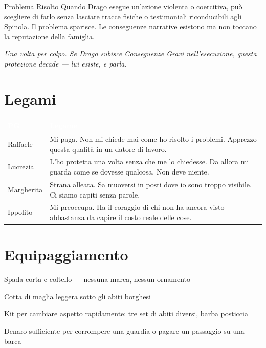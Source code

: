 
\begin{spinolabox}{Problema Risolto}
  Quando Drago esegue un'azione violenta o coercitiva, può scegliere di farlo
  senza lasciare tracce fisiche o testimoniali riconducibili agli Spinola.
  Il problema sparisce. Le conseguenze narrative esistono ma non toccano
  la reputazione della famiglia.

  \medskip\noindent\textit{Una volta per colpo. Se Drago subisce Conseguenze
  Gravi nell'esecuzione, questa protezione decade — lui esiste, e parla.}
\end{spinolabox}

\section*{Legami}

\begin{table}[h]
\centering\renewcommand{\arraystretch}{1.4}
\begin{tabularx}{\linewidth}{@{}L{2.6cm} X@{}}
  \toprule{}
  \textcolor{white}{\textbf{PG}} & \textcolor{white}{\textbf{Legame}} \\
  \midrule
  Raffaele & Mi paga. Non mi chiede mai come ho risolto i problemi.
            Apprezzo questa qualità in un datore di lavoro. \\
  Lucrezia & L'ho protetta una volta senza che me lo chiedesse.
            Da allora mi guarda come se dovesse qualcosa. Non deve niente. \\
  Margherita & Strana alleata. Sa muoversi in posti dove io sono troppo
              visibile. Ci siamo capiti senza parole. \\
  Ippolito & Mi preoccupa. Ha il coraggio di chi non ha ancora visto
            abbastanza da capire il costo reale delle cose. \\
  \bottomrule
\end{tabularx}
\end{table}

\section*{Equipaggiamento}
\begin{goldlist}
  \item Spada corta e coltello — nessuna marca, nessun ornamento
  \item Cotta di maglia leggera sotto gli abiti borghesi
  \item Kit per cambiare aspetto rapidamente: tre set di abiti diversi, barba posticcia
  \item Denaro sufficiente per corrompere una guardia o pagare un passaggio su una barca
\end{goldlist}

